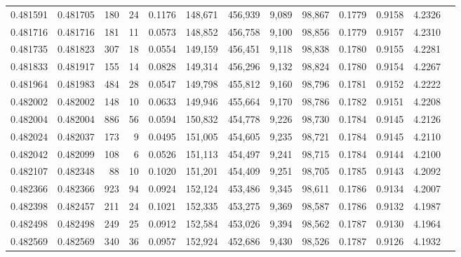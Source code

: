 \begin{tabular}{rrrrrrrrrrrrr}
0.481591 & 0.481705 &   180 &    24 &                                     0.1176 & 148,671 & 456,939 &   9,089 &  98,867 & 0.1779 & 0.9158 & 4.2326 \\
0.481716 & 0.481716 &   181 &    11 &                                     0.0573 & 148,852 & 456,758 &   9,100 &  98,856 & 0.1779 & 0.9157 & 4.2310 \\
0.481735 & 0.481823 &   307 &    18 &                                     0.0554 & 149,159 & 456,451 &   9,118 &  98,838 & 0.1780 & 0.9155 & 4.2281 \\
0.481833 & 0.481917 &   155 &    14 &                                     0.0828 & 149,314 & 456,296 &   9,132 &  98,824 & 0.1780 & 0.9154 & 4.2267 \\
0.481964 & 0.481983 &   484 &    28 &                                     0.0547 & 149,798 & 455,812 &   9,160 &  98,796 & 0.1781 & 0.9152 & 4.2222 \\
0.482002 & 0.482002 &   148 &    10 &                                     0.0633 & 149,946 & 455,664 &   9,170 &  98,786 & 0.1782 & 0.9151 & 4.2208 \\
0.482004 & 0.482004 &   886 &    56 &                                     0.0594 & 150,832 & 454,778 &   9,226 &  98,730 & 0.1784 & 0.9145 & 4.2126 \\
0.482024 & 0.482037 &   173 &     9 &                                     0.0495 & 151,005 & 454,605 &   9,235 &  98,721 & 0.1784 & 0.9145 & 4.2110 \\
0.482042 & 0.482099 &   108 &     6 &                                     0.0526 & 151,113 & 454,497 &   9,241 &  98,715 & 0.1784 & 0.9144 & 4.2100 \\
0.482107 & 0.482348 &    88 &    10 &                                     0.1020 & 151,201 & 454,409 &   9,251 &  98,705 & 0.1785 & 0.9143 & 4.2092 \\
0.482366 & 0.482366 &   923 &    94 &                                     0.0924 & 152,124 & 453,486 &   9,345 &  98,611 & 0.1786 & 0.9134 & 4.2007 \\
0.482398 & 0.482457 &   211 &    24 &                                     0.1021 & 152,335 & 453,275 &   9,369 &  98,587 & 0.1786 & 0.9132 & 4.1987 \\
0.482498 & 0.482498 &   249 &    25 &                                     0.0912 & 152,584 & 453,026 &   9,394 &  98,562 & 0.1787 & 0.9130 & 4.1964 \\
0.482569 & 0.482569 &   340 &    36 &                                     0.0957 & 152,924 & 452,686 &   9,430 &  98,526 & 0.1787 & 0.9126 & 4.1932 \\

\end{tabular}
